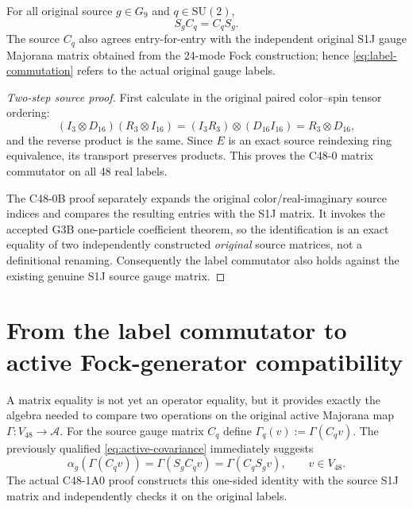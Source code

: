\begin{theorem}
\label{thm:c48-commutation}
For all original source $g\in G_9$ and $q\in\mathrm{SU}(2)$,
\begin{equation}\label{eq:label-commutation}
 S_gC_q=C_qS_g.
\end{equation}
The source $C_q$ also agrees entry-for-entry with the independent
original S1J gauge Majorana matrix obtained from the 24-mode Fock
construction; hence \eqref{eq:label-commutation} refers to the
actual original gauge labels.
\end{theorem}
\begin{proof}[Two-step source proof]
First calculate in the original paired color--spin tensor ordering:
\[
 (I_3\otimes D_{16})(R_3\otimes I_{16})
   =(I_3R_3)\otimes(D_{16}I_{16})=R_3\otimes D_{16},
\]
and the reverse product is the same. Since $E$ is an exact source
reindexing ring equivalence, its transport preserves products.
This proves the C48-0 matrix commutator on all 48 real labels.

The C48-0B proof separately expands the original color/real-imaginary
source indices and compares the resulting entries with the S1J
matrix. It invokes the accepted G3B one-particle coefficient theorem,
so the identification is an exact equality of two independently
constructed \emph{original} source matrices, not a definitional
renaming. Consequently the label commutator also holds against the
existing genuine S1J source gauge matrix.
\end{proof}

\section{From the label commutator to active Fock-generator compatibility}
A matrix equality is not yet an operator equality, but it provides
exactly the algebra needed to compare two operations on the original
active Majorana map $\Gamma:V_{48}\to\mathscr A$.
For the source gauge matrix $C_q$ define
$\Gamma_q(v):=\Gamma(C_qv)$. The previously qualified
\eqref{eq:active-covariance} immediately suggests
\begin{equation}\label{eq:one-sided-gamma-compatibility}
 \alpha_g(\Gamma(C_qv))
 =\Gamma(S_gC_qv)=\Gamma(C_qS_gv),
 \qquad v\in V_{48}.
\end{equation}
The actual C48-1A0 proof constructs this one-sided identity with the
source S1J matrix and independently checks it on the original labels.

